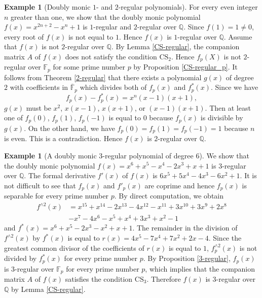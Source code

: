 \documentclass{amsart}
\theoremstyle{plain}
\theoremstyle{definition}
\newtheorem{exmp}[thm]{Example}
\theoremstyle{remark}
\begin{document}
\begin{exmp}[Doubly monic $1$- and $2$-regular polynomials] 
For every even integer $n$ greater than one, we show that the doubly monic polynomial 
$f(x)=x^{2n+2}-x^n+1$ is $1$-regular and $2$-regular over $\mathbb{Q}$. 
Since $f(1)=1\ne 0$, every root of $f(x)$ is not equal to $1$. Hence $f(x)$ is $1$-regular over $\mathbb{Q}$. 
Assume that $f(x)$ is not $2$-regular over $\mathbb{Q}$. 
By Lemma \ref{CS-regular}, the companion matrix $A$ of $f(x)$ does not satisfy the condition $\mathrm{CS}_2$. 
Hence $f_p(X)$ is not $2$-regular over $\mathbb{F}_p$ for some prime number $p$ 
by Proposition \ref{CS-regular_p}. 
It follows from Theorem \ref{2-regular} that there exists a polynomial $g(x)$ of 
degree $2$ with coefficients in $\overline{\mathbb{F}}_p$ which divides 
both of $f_p(x)$ and $f_p^*(x)$. Since we have
\[
f_p(x)-f_p^*(x)=x^n(x-1)(x+1), 
\]
$g(x)$ must be $x^2$, $x(x-1)$, $x(x+1)$, or $(x-1)(x+1)$. 
Then at least one of $f_p(0)$, $f_p(1)$, $f_p(-1)$ is equal to $0$ because $f_p(x)$ is divisible by 
$g(x)$. On the other hand, we have $f_p(0)=f_p(1)=f_p(-1)=1$ because $n$ is even. 
This is a contradiction. Hence $f(x)$ is $2$-regular over $\mathbb{Q}$. 
\end{exmp}

\begin{exmp}[A doubly monic $3$-regular polynomial of degree $6$] 
We show that the doubly monic polynomial 
$f(x)=x^6+x^5-x^4-2x^3+x+1$ is $3$-regular over $\mathbb{Q}$. 
The formal derivative $f'(x)$ of $f(x)$ is $6x^5+5x^4-4x^3-6x^2+1$. 
It is not difficult to see that $f_p(x)$ and $f'_p(x)$ are coprime and hence $f_p(x)$ is separable 
for every prime number $p$. 
By direct computation, we obtain 
{\allowdisplaybreaks %
\begin{align*}
f^{\wedge 2}(x) & =x^{15}+x^{14}-2x^{13}-4x^{12}-x^{11}+3x^{10}+3x^9+2x^8 \\
& -x^7-4x^6-x^5+x^4+3x^3+x^2-1 
\end{align*}}
and $f^*(x)=x^6+x^5-2x^3-x^2+x+1$. 
The remainder in the division of $f^{\wedge 2}(x)$ by $f^*(x)$ is equal to 
$r(x)=4x^5-7x^4+7x^2+2x-4$. 
Since the greatest common divisor of the coefficients of $r(x)$ is equal to $1$, 
$f_p^{\wedge 2}(x)$ is not divided by $f_p^*(x)$ for every prime number $p$. 
By Proposition \ref{3-regular}, $f_p(x)$ is $3$-regular over $\mathbb{F}_p$ for every prime number $p$, 
which implies that the companion matrix $A$ of $f(x)$ satisfies the condition $\mathrm{CS}_3$. 
Therefore $f(x)$ is $3$-regular over $\mathbb{Q}$ by Lemma \ref{CS-regular}. 
\end{exmp}
\end{document}
